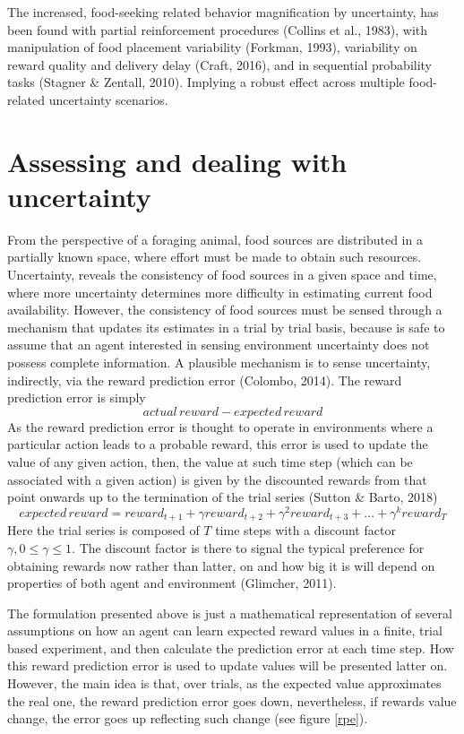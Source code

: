 \documentclass[
]{/home/nicoluarte/Downloads/templates/PNAS-template-main.tex}
\begin{document}
The increased, food-seeking related behavior magnification by
uncertainty, has been found with partial reinforcement procedures
(Collins et al., 1983), with manipulation of food placement variability
(Forkman, 1993), variability on reward quality and delivery delay
(Craft, 2016), and in sequential probability tasks (Stagner \& Zentall,
2010). Implying a robust effect across multiple food-related uncertainty
scenarios.

\hypertarget{assessing-and-dealing-with-uncertainty}{%
\section{Assessing and dealing with
uncertainty}\label{assessing-and-dealing-with-uncertainty}}

From the perspective of a foraging animal, food sources are distributed
in a partially known space, where effort must be made to obtain such
resources. Uncertainty, reveals the consistency of food sources in a
given space and time, where more uncertainty determines more difficulty
in estimating current food availability. However, the consistency of
food sources must be sensed through a mechanism that updates its
estimates in a trial by trial basis, because is safe to assume that an
agent interested in sensing environment uncertainty does not possess
complete information. A plausible mechanism is to sense uncertainty,
indirectly, via the reward prediction error (Colombo, 2014). The reward
prediction error is simply \[ actual\,reward - expected\,reward \] As
the reward prediction error is thought to operate in environments where
a particular action leads to a probable reward, this error is used to
update the value of any given action, then, the value at such time step
(which can be associated with a given action) is given by the discounted
rewards from that point onwards up to the termination of the trial
series (Sutton \& Barto, 2018)
\[ expected\,reward = reward_{t+1} + \gamma reward_{t+2} + \gamma^2 reward_{t+3} + \ldots + \gamma^k reward_{T}\]
Here the trial series is composed of \(T\) time steps with a discount
factor \(\gamma, 0 \leq \gamma \leq 1\). The discount factor is there to
signal the typical preference for obtaining rewards now rather than
latter, on and how big it is will depend on properties of both agent and
environment (Glimcher, 2011).

The formulation presented above is just a mathematical representation of
several assumptions on how an agent can learn expected reward values in
a finite, trial based experiment, and then calculate the prediction
error at each time step. How this reward prediction error is used to
update values will be presented latter on. However, the main idea is
that, over trials, as the expected value approximates the real one, the
reward prediction error goes down, nevertheless, if rewards value
change, the error goes up reflecting such change (see figure \ref{rpe}).
\end{document}
